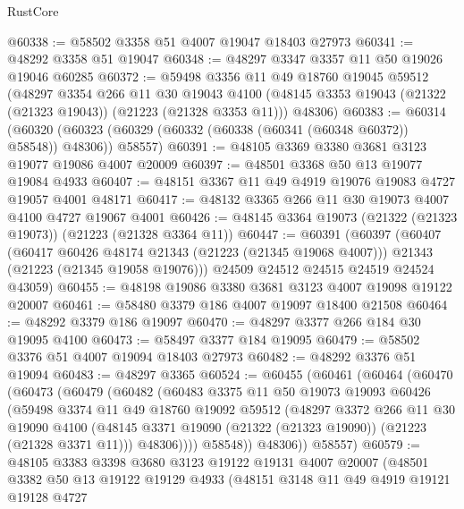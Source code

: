 \begin{lexlean}{RustCore}
\begin{coremodule}
@60338 := @58502 @3358 @51 @4007 @19047 @18403 @27973
@60341 := @48292 @3358 @51 @19047
@60348 := @48297 @3347 @3357 @11 @50 @19026 @19046 @60285
@60372 := @59498
    @3356
    @11
    @49
    @18760
    @19045
    @59512
    (@48297
      @3354
      @266
      @11
      @30
      @19043
      @4100
      (@48145 @3353 @19043 (@21322 (@21323 @19043)) (@21223 (@21328 @3353 @11)))
      @48306)
@60383 := @60314
    (@60320 (@60323 (@60329 (@60332 (@60338 (@60341 (@60348 @60372)) @58548)) @48306)) @58557)
@60391 := @48105 @3369 @3380 @3681 @3123 @19077 @19086 @4007 @20009
@60397 := @48501 @3368 @50 @13 @19077 @19084 @4933
@60407 := @48151 @3367 @11 @49 @4919 @19076 @19083 @4727 @19057 @4001 @48171
@60417 := @48132 @3365 @266 @11 @30 @19073 @4007 @4100 @4727 @19067 @4001
@60426 := @48145 @3364 @19073 (@21322 (@21323 @19073)) (@21223 (@21328 @3364 @11))
@60447 := @60391
    (@60397
      (@60407
        (@60417 @60426 @48174 @21343 (@21223 (@21345 @19068 @4007)))
        @21343
        (@21223 (@21345 @19058 @19076)))
      @24509
      @24512
      @24515
      @24519
      @24524
      @43059)
@60455 := @48198 @19086 @3380 @3681 @3123 @4007 @19098 @19122 @20007
@60461 := @58480 @3379 @186 @4007 @19097 @18400 @21508
@60464 := @48292 @3379 @186 @19097
@60470 := @48297 @3377 @266 @184 @30 @19095 @4100
@60473 := @58497 @3377 @184 @19095
@60479 := @58502 @3376 @51 @4007 @19094 @18403 @27973
@60482 := @48292 @3376 @51 @19094
@60483 := @48297 @3365
@60524 := @60455
    (@60461
      (@60464
        (@60470
          (@60473
            (@60479
              (@60482
                (@60483
                  @3375
                  @11
                  @50
                  @19073
                  @19093
                  @60426
                  (@59498
                    @3374
                    @11
                    @49
                    @18760
                    @19092
                    @59512
                    (@48297
                      @3372
                      @266
                      @11
                      @30
                      @19090
                      @4100
                      (@48145 @3371 @19090 (@21322 (@21323 @19090)) (@21223 (@21328 @3371 @11)))
                      @48306))))
              @58548))
          @48306))
      @58557)
@60579 := @48105
    @3383
    @3398
    @3680
    @3123
    @19122
    @19131
    @4007
    @20007
    (@48501
      @3382
      @50
      @13
      @19122
      @19129
      @4933
      (@48151
        @3148
        @11
        @49
        @4919
        @19121
        @19128
        @4727

\end{coremodule}
\end{lexlean}

